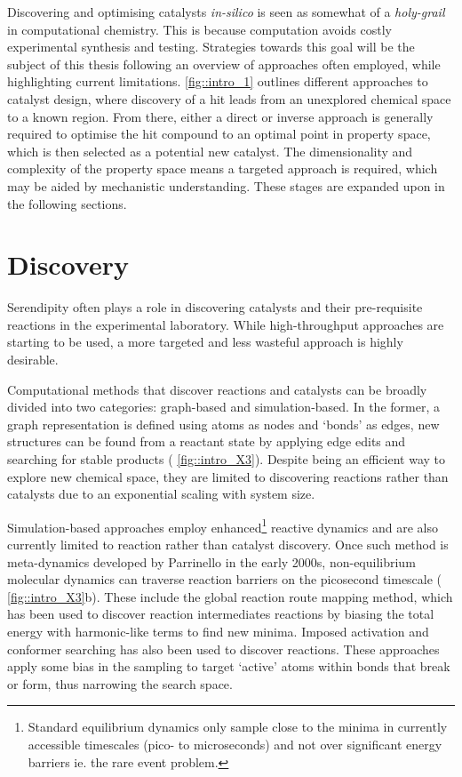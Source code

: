 \documentclass[../main.tex]{subfiles}
\begin{document}
Discovering and optimising catalysts \emph{in-silico} is seen as somewhat of a \emph{holy-grail} in computational chemistry.\cite{Poree2017} This is because computation avoids costly experimental synthesis and testing. Strategies towards this goal will be the subject of this thesis following an overview of approaches often employed, while highlighting current limitations. \figurename{ \ref{fig::intro_1}} outlines different approaches to catalyst design, where discovery of a hit leads from an unexplored chemical space to a known region. From there, either a direct or inverse approach is generally required to optimise the hit compound to an optimal point in property space, which is then selected as a potential new catalyst. The dimensionality and complexity of the property space means a targeted approach is required, which may be aided by mechanistic understanding. These stages are expanded upon in the following sections.


\section{Discovery}

Serendipity often plays a role in discovering catalysts and their pre-requisite reactions in the experimental laboratory.\cite{Nicolaou2014, McNally2011} While high-throughput approaches are starting to be used,\cite{McNally2011, Troshin2017, Ahneman2018} a more targeted and less wasteful approach is highly desirable.

Computational methods that discover reactions and catalysts can be broadly divided into two categories: graph-based and simulation-based.\cite{Meisner2019, Dewyer2017} In the former, a graph representation is defined using atoms as  nodes and `bonds' as edges, new structures can be found from a reactant state by applying edge edits and searching for stable products (\figurename{ \ref{fig::intro_X3}}).\cite{Habershon2016, Ismail2019, Robertson2019, Kim2018, Lee2020pccp, McDermott2021} Despite being an efficient way to explore new chemical space, they are limited to discovering reactions rather than catalysts due to an exponential scaling with system size.

Simulation-based approaches employ enhanced\footnote{Standard equilibrium dynamics only sample close to the minima in currently accessible timescales (pico- to microseconds) and not over significant energy barriers ie. the rare event problem.\cite{Gerardo2009}} reactive dynamics and are also currently limited to reaction rather than catalyst discovery. Once such method is meta-dynamics developed by Parrinello in the early 2000s,\cite{Laio2002} non-equilibrium molecular dynamics\cite{Yang2019} can traverse reaction barriers on the picosecond timescale (\figurename{ \ref{fig::intro_X3}}b). These include the global reaction route mapping method,\cite{Maeda2013} which has been used to discover reaction intermediates\cite{Uematsu2015, Yoshimura2017} reactions by biasing the total energy with harmonic-like terms to find new minima. Imposed activation and conformer searching has also been used to discover reactions.\cite{Lavigne2020} These approaches apply some bias in the sampling to target `active' atoms within bonds that break or form, thus narrowing the search space. 
\end{document}
